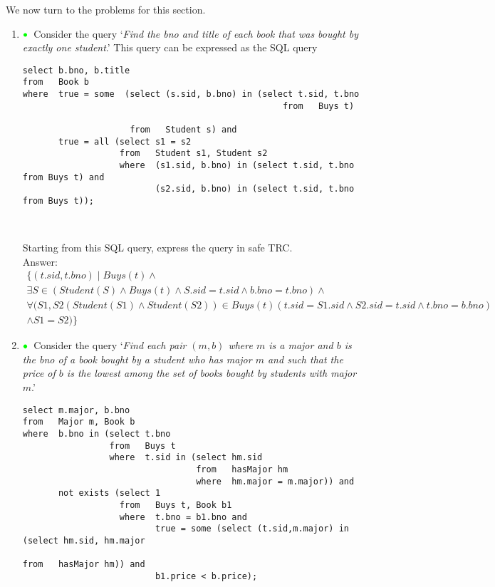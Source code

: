 \documentclass[11pt]{article}
\newcommand{\green}[1]{{\color{green}#1}}
\newcommand{\greenbullet}{$\green{\bullet}$}
\begin{document}
We now turn to the problems for this section.

\begin{enumerate}
\item\label{queryOne} \greenbullet\  Consider the query `\emph{Find the bno and title of each book that was bought by exactly one student}.'   This query can be expressed as the SQL query

{\footnotesize
\begin{verbatim}
select b.bno, b.title
from   Book b
where  true = some  (select (s.sid, b.bno) in (select t.sid, t.bno
	                                               from   Buys t)

                     from   Student s) and
       true = all (select s1 = s2
                   from   Student s1, Student s2
                   where  (s1.sid, b.bno) in (select t.sid, t.bno from Buys t) and
                          (s2.sid, b.bno) in (select t.sid, t.bno from Buys t));
                        
                          
\end{verbatim}
}

Starting from this SQL query, express the query in safe TRC.\\
Answer: \\
{\large
\[
\begin{array}{l}
\{(t.sid,t.bno)\mid Buys(t) \land \\
 \exists S \in (Student(S) \land Buys(t) \land S.sid=t.sid \land b.bno=t.bno)\land\\
 \forall (S1,S2 (Student(S1)\land Student(S2)) \in Buys(t)(t.sid=S1.sid \land S2.sid=t.sid \land t.bno=b.bno)\\ \land S1=S2)
 \}
\end{array}
\]}


\item\label{queryTwo} \greenbullet\   
Consider the query `\emph{Find each pair $(m, b)$
where $m$ is a major and $b$ is the bno of a book bought by a student who has major $m$ and such that the price of $b$ is the lowest among the set of books bought by students with major $m$}.' 



{\footnotesize
\begin{verbatim}
select m.major, b.bno
from   Major m, Book b
where  b.bno in (select t.bno
                 from   Buys t
                 where  t.sid in (select hm.sid
                                  from   hasMajor hm
                                  where  hm.major = m.major)) and
       not exists (select 1
                   from   Buys t, Book b1
                   where  t.bno = b1.bno and
                          true = some (select (t.sid,m.major) in (select hm.sid, hm.major 
                                                                  from   hasMajor hm)) and
                          b1.price < b.price);
\end{verbatim}
}


\end{enumerate}
\end{document}
